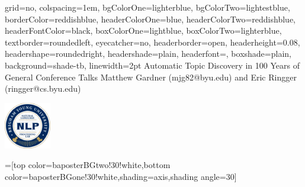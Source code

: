 \documentclass[landscape,final]{baposter}
\begin{document}

\begin{poster}{
  grid=no,
  colspacing=1em,
  bgColorOne=lighterblue,
  bgColorTwo=lightestblue,
  borderColor=reddishblue,
  headerColorOne=blue,
  headerColorTwo=reddishblue,
  headerFontColor=black,
  boxColorOne=lightblue,
  boxColorTwo=lighterblue,
  textborder=roundedleft,
  eyecatcher=no,
  headerborder=open,
  headerheight=0.08\textheight,
  headershape=roundedright,
  headershade=plain,
  headerfont=\Large\textsf, %
  boxshade=plain,
  background=shade-tb,
  linewidth=2pt
  }
  {} %
  {\sf %
  Automatic Topic Discovery in 100 Years of General Conference Talks}
  {\sf %
  Matthew Gardner
  (mjg82@byu.edu)
  and
  Eric Ringger
  (ringger@cs.byu.edu)
  }
  {{\begin{minipage}{16em}
    \hfill
    \includegraphics[height=5.5em]{byunlp.eps}
  \end{minipage}}
  }

  =[top color=baposterBGtwo!30!white,bottom color=baposterBGone!30!white,shading=axis,shading angle=30]

     \newlength{\leftimgwidth}
     \setlength{\leftimgwidth}{0.78em+8.0em}


\end{poster}
\end{document}
